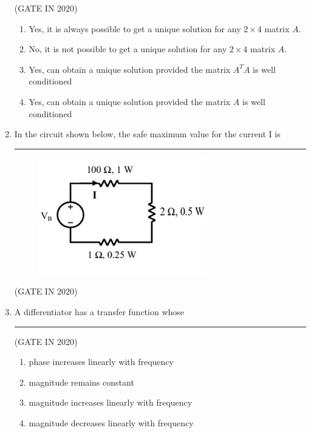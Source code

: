 \documentclass[journal,12pt,onecolumn]{IEEEtran}
\theoremstyle{remark}
\begin{document}
\begin{enumerate}
\hfill{(GATE IN 2020)}
\begin{enumerate}
\item Yes, it is always possible to get a unique solution for any $2 \times 4$ matrix $A$.
\item No, it is not possible to get a unique solution for any $2 \times 4$ matrix $A$.
\item Yes, can obtain a unique solution provided the matrix $A^T A$ is well conditioned
\item Yes, can obtain a unique solution provided the matrix $A$ is well conditioned
\end{enumerate}

\item In the circuit shown below, the safe maximum value for the current I is \rule{2cm}{0.4pt}
\begin{figure}[H]
\centering
\includegraphics[width=0.4\columnwidth]{figs/q6.jpg}
\caption*{}
\label{fig:q6}
\end{figure}

\hfill{(GATE IN 2020)}
\begin{enumerate}
\end{enumerate}

\item A differentiator has a transfer function whose \rule{2cm}{0.4pt}

\hfill{(GATE IN 2020)}
\begin{enumerate}
\item phase increases linearly with frequency
\item magnitude remains constant
\item magnitude increases linearly with frequency
\item magnitude decreases linearly with frequency
\end{enumerate}


\end{enumerate}
\end{document}
